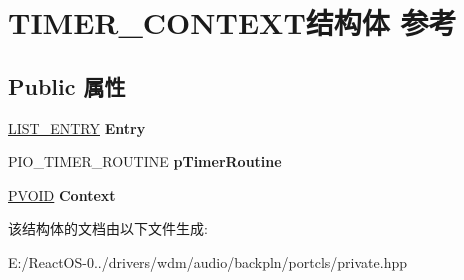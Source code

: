 \hypertarget{struct_t_i_m_e_r___c_o_n_t_e_x_t}{}\section{T\+I\+M\+E\+R\+\_\+\+C\+O\+N\+T\+E\+X\+T结构体 参考}
\label{struct_t_i_m_e_r___c_o_n_t_e_x_t}
\subsection*{Public 属性}
\begin{DoxyCompactItemize}
\item 
\mbox{\label{struct_t_i_m_e_r___c_o_n_t_e_x_t_a4da61246034077b0ce794a1702efedd5}} 
\hyperlink{struct___l_i_s_t___e_n_t_r_y}{L\+I\+S\+T\+\_\+\+E\+N\+T\+RY} {\bfseries Entry}
\item 
\mbox{\label{struct_t_i_m_e_r___c_o_n_t_e_x_t_aa7f6514db12a7316a96f5d51905223b7}} 
P\+I\+O\+\_\+\+T\+I\+M\+E\+R\+\_\+\+R\+O\+U\+T\+I\+NE {\bfseries p\+Timer\+Routine}
\item 
\mbox{\label{struct_t_i_m_e_r___c_o_n_t_e_x_t_a9fac3e3ddd11682916b542d19cb6f7a2}} 
\hyperlink{interfacevoid}{P\+V\+O\+ID} {\bfseries Context}
\end{DoxyCompactItemize}


该结构体的文档由以下文件生成\+:\begin{DoxyCompactItemize}
\item 
E\+:/\+React\+O\+S-\/0../drivers/wdm/audio/backpln/portcls/private.\+hpp\end{DoxyCompactItemize}

